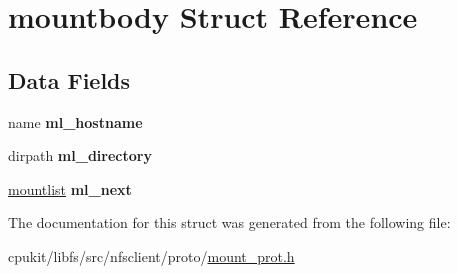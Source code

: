 \hypertarget{structmountbody}{}\section{mountbody Struct Reference}
\label{structmountbody}
\subsection*{Data Fields}
\begin{DoxyCompactItemize}
\item 
\mbox{\label{structmountbody_a8458f03e17b35f0ba799fd0ea5b1ec98}} 
name {\bfseries ml\+\_\+hostname}
\item 
\mbox{\label{structmountbody_ac9d7af9a4459523f2076b5b6614620fe}} 
dirpath {\bfseries ml\+\_\+directory}
\item 
\mbox{\label{structmountbody_a76ebc5ffb41dc60c97c61b404be31bbd}} 
\mbox{\hyperlink{structmountbody}{mountlist}} {\bfseries ml\+\_\+next}
\end{DoxyCompactItemize}


The documentation for this struct was generated from the following file\+:\begin{DoxyCompactItemize}
\item 
cpukit/libfs/src/nfsclient/proto/\mbox{\hyperlink{mount__prot_8h}{mount\+\_\+prot.\+h}}\end{DoxyCompactItemize}
